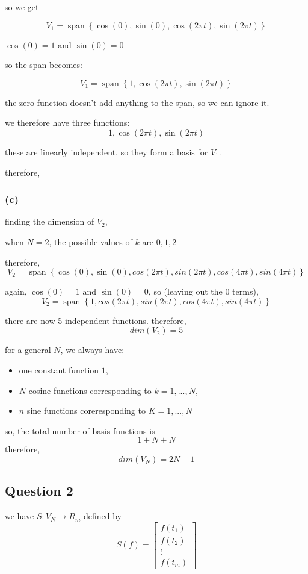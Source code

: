 \documentclass{article}
\begin{document}
so we get

\[
V_1= \operatorname{span} \left\{ \cos(0),\sin(0), \cos(2\pi t),\sin(2\pi t) \right\}
\]

$\cos(0)=1$ and $\sin(0)=0$

so the span becomes:

\[
V_1= \operatorname{span} \left\{ 1,\cos(2\pi t),\sin(2\pi t) \right\}
\]

the zero function doesn't add anything to the span, so we can ignore it.

we therefore have three functions:
\[
1,\cos(2\pi t),\sin(2\pi t)
\]

these are linearly independent, so they form a basis for \(V_1\).

therefore, 

\subsubsection*{(c)}
finding the dimension of $V_2$,

when $N=2$, the possible values of $k$ are $0,1,2$

therefore,
\[
V_2 = \operatorname{span} \left\{\cos(0), \sin(0), cos(2\pi t), sin(2\pi t), cos(4\pi t), sin(4\pi t) \right\}
\]

again, $\cos(0) = 1$ and $\sin(0) = 0$, so (leaving out the $0$ terms),
\[
V_2 = \operatorname{span} \left\{1, cos(2\pi t), sin(2\pi t), cos(4\pi t), sin(4\pi t) \right\}
\]

there are now 5 independent functions. therefore,
\[
\boxed{dim(V_2) = 5}
\]

for a general $N$, we always have:
\begin{itemize}
    \item one constant function $1$,
    \item $N$ cosine functions corresponding to $k=1,...,N$,
    \item $n$ sine functions coreresponding to $K=1,...,N$
\end{itemize}
so, the total number of basis functions is
\[
1+N+N
\]
therefore,
\[
\boxed{dim(V_N) = 2N + 1}
\]

\subsection{Question 2}

we have $S:V_N \rightarrow R_m$ defined by
\[
S(f) = 
\begin{bmatrix}
    f(t_1) \\
    f(t_2) \\
    \vdots \\
    f(t_m)
\end{bmatrix}
\]
\end{document}
